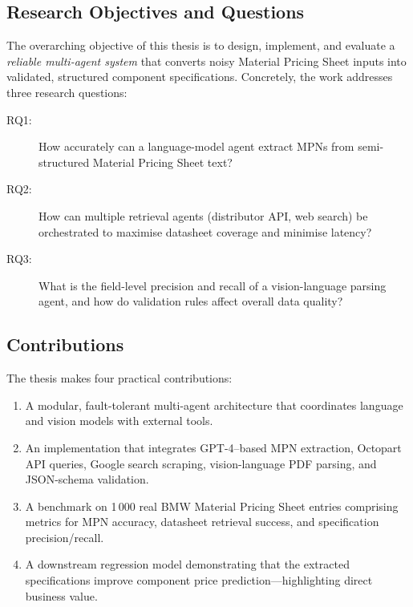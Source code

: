\documentclass[11pt]{article}
\begin{document}
\subsection{Research Objectives and Questions}
The overarching objective of this thesis is to design, implement, and evaluate a \emph{reliable multi-agent system} that converts noisy Material Pricing Sheet inputs into validated, structured component specifications.  
Concretely, the work addresses three research questions:

\begin{description}
  \item[RQ1:] How accurately can a language-model agent extract MPNs from semi-structured Material Pricing Sheet text?
  \item[RQ2:] How can multiple retrieval agents (distributor API, web search) be orchestrated to maximise datasheet coverage and minimise latency?
  \item[RQ3:] What is the field-level precision and recall of a vision-language parsing agent, and how do validation rules affect overall data quality?
\end{description}

\subsection{Contributions}
The thesis makes four practical contributions:
\begin{enumerate}
  \item A modular, fault-tolerant multi-agent architecture that coordinates language and vision models with external tools.
  \item An implementation that integrates GPT-4–based MPN extraction, Octopart API queries, Google search scraping, vision-language PDF parsing, and JSON-schema validation.
  \item A benchmark on 1\,000 real BMW Material Pricing Sheet entries comprising metrics for MPN accuracy, datasheet retrieval success, and specification precision/recall.
  \item A downstream regression model demonstrating that the extracted specifications improve component price prediction—highlighting direct business value.
\end{enumerate}
\end{document}

